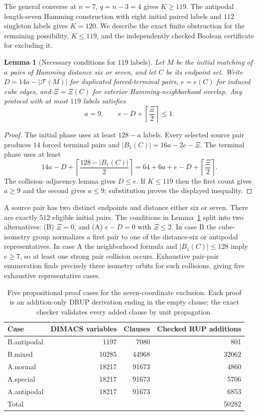 \documentclass[11pt,a4paper]{article}
\newtheorem{lemma}[theorem]{Lemma}
\begin{document}
The general converse at $n=7$, $q=n-3=4$ gives $K\ge119$. The antipodal length-seven Hamming construction with eight initial paired labels and $112$ singleton labels gives $K=120$. We describe the exact finite obstruction for the remaining possibility, $K\le119$, and the independently checked Boolean certificate for excluding it.

\begin{lemma}[Necessary conditions for $119$ labels]\label{lem:seven-necessary}
Let $M$ be the initial matching of $a$ pairs of Hamming distance six or seven, and let $C$ be its endpoint set. Write $D=14a-|\mathcal F(M)|$ for duplicated forced-terminal pairs, $e=e(C)$ for induced cube edges, and $\Xi=\Xi(C)$ for exterior Hamming-neighborhood overlap. Any protocol with at most $119$ labels satisfies
\[
 a=9,\qquad e-D+\left\lceil\frac{\Xi}{2}\right\rceil\le1.
\]
\end{lemma}
\begin{proof}
The initial phase uses at least $128-a$ labels. Every selected source pair produces $14$ forced terminal pairs and $|B_1(C)|=16a-2e-\Xi$.
The terminal phase uses at least
\[
 14a-D+\left\lceil\frac{128-|B_1(C)|}{2}\right\rceil
 =64+6a+e-D+\left\lceil\frac\Xi2\right\rceil.
\]
The collision--adjacency lemma gives $D\le e$. If $K\le119$ then the first count gives $a\ge9$ and the second gives $a\le9$; substitution proves the displayed inequality.
\end{proof}

A source pair has two distinct endpoints and distance either six or seven. There are exactly $512$ eligible initial pairs. The conditions in Lemma~\ref{lem:seven-necessary} split into two alternatives: (B) $\Xi=0$, and (A) $e-D=0$ with $\Xi\le2$. In case B the cube-isometry group normalizes a first pair to one of the distance-six or antipodal representatives. In case A the neighborhood formula and $|B_1(C)|\le128$ imply $e\ge7$, so at least one strong pair collision occurs. Exhaustive pair-pair enumeration finds precisely three isometry orbits for such collisions, giving five exhaustive representative cases.

\begin{table}[t]\centering\small
\begin{tabular}{@{}lrrr@{}}\toprule
Case & DIMACS variables & Clauses & Checked RUP additions\\\midrule
B.antipodal & 1197 & 7080 & 801\\
B.mixed & 10285 & 44968 & 32062\\
A.normal & 18217 & 91673 & 4860\\
A.special & 18217 & 91673 & 5706\\
A.antipodal & 18217 & 91673 & 6853\\\midrule
Total & & & 50282\\\bottomrule
\end{tabular}
\caption{Five propositional proof cases for the seven-coordinate exclusion. Each proof is an addition-only DRUP derivation ending in the empty clause; the exact checker validates every added clause by unit propagation.}\label{tab:certcases}
\end{table}
\end{document}
